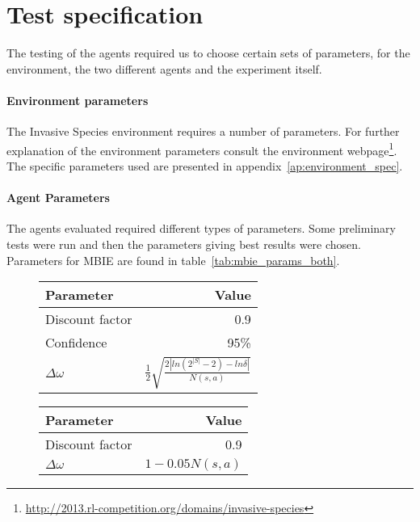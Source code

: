 \section{Test specification}
\label{sec:test_spec}

The testing of the agents required us to choose certain sets of parameters, for
the environment, the two different agents and the experiment itself. 

\paragraph{Environment parameters}

The Invasive Species environment requires a number of parameters. For further
explanation of the environment parameters consult the environment
webpage\footnote{\url{http://2013.rl-competition.org/domains/invasive-species}}.
The specific parameters used are presented in
appendix~\ref{ap:environment_spec}.

\paragraph{Agent Parameters}

The agents evaluated required different types of parameters. Some preliminary
tests were run and then the parameters giving best results were chosen.
Parameters for MBIE are found in table~\ref{tab:mbie_params_both}.

\begin{table}[H]
\centering
{}
\label{tab:mbie_params_both}

\begin{subfigure}[b]{0.47\textwidth}
    \centering
    \label{tab:mbie_params} 
    \begin{tabular}{lr}
     \toprule
     Parameter & Value \\
     \midrule
     Discount factor & 0.9 \\
     Confidence & 95\% \\
     $\Delta \omega$ & $\frac{1}{2}\sqrt{\frac{2|ln(2^{|S|}-2) - ln  \delta |}{N(s,a)}}$ \\
     
     \bottomrule
    \end{tabular}
\end{subfigure}
\quad
\begin{subfigure}[b]{0.47\textwidth}
    \centering
    \label{tab:mbie_realistic_params}
    \begin{tabular}{lr}
     \toprule
     Parameter & Value \\
     \midrule
     Discount factor & 0.9 \\
     $\Delta \omega$ & $1 - 0.05 N(s,a)$ \\
     \bottomrule
    \end{tabular}
\end{subfigure}
\end{table}

